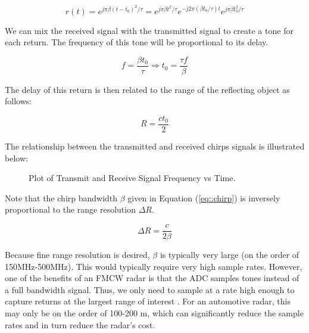 \documentclass[conference]{IEEEtran}
\begin{document}
	\begin{equation}
		r(t) = e^{j\pi{\beta}(t - t_0)^2/\tau} = e^{j\pi{\beta}t^2/\tau}e^{-j2\pi({\beta}t_0/\tau)t}e^{j\pi{\beta}t_0^2/\tau}
		\label{eq::delayed_chirp}
	\end{equation}
	
	We can mix the received signal with the transmitted signal to create a tone for each return. The frequency of this tone will be proportional to its delay.
	
	\begin{equation}
		f = \frac{{\beta}t_0}{\tau} \Rightarrow t_0 = \frac{{\tau}f}{\beta}
	\end{equation}
	
	The delay of this return is then related to the range of the reflecting object as follows:
	
	\begin{equation}
		R = \frac{ct_0}{2}
	\end{equation}
	
	The relationship between the transmitted and received chirps signals is illustrated below:
	
	\begin{figure}[H]
    		\centering
    		\caption{Plot of Transmit and Receive Signal Frequency vs Time.\cite{Long2019AssistingTV}}
    		\label{fig::fmcw_spectrogram}
	\end{figure}
	
	Note that the chirp bandwidth $\beta$ given in Equation (\ref{eq::chirp}) is inversely proportional to the range resolution ${\Delta}R$.
	
	\begin{equation}
		{\Delta}R = \frac{c}{2\beta}
		\label{eq::range_resolution}
	\end{equation}
	
	Because fine range resolution is desired, $\beta$ is typically very large (on the order of 150MHz-500MHz). This would typically require very high sample rates. However, one of the benefits of an FMCW radar is that the ADC samples tones instead of a full bandwidth signal. Thus, we only need to sample at a rate high enough to capture returns at the largest range of interest \cite{richards-2005}. For an automotive radar, this may only be on the order of 100-200 m, which can significantly reduce the sample rates and in turn reduce the radar's cost.
	
\end{document}
